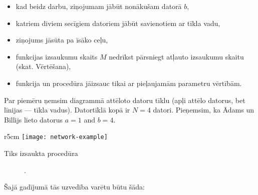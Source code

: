 \documentclass{boi2014-lv}
\begin{document}
    \begin{itemize}
        \item kad  beidz darbu, ziņojumam jābūt nonākušam datorā $b$,
        \item katriem diviem secīgiem datoriem jābūt savienotiem ar tīkla vadu,
        \item ziņojums jāsūta pa īsāko ceļu,
        \item funkcijas  izsaukumu skaits $M$ nedrīkst pārsniegt atļauto izsaukumu skaitu (skat. Vērtēšana),
        \item funkcija  un procedūra  jāizsauc tikai ar pieļaujamām parametru vērtībām.
    \end{itemize}

    \Example
    Par piemēru ņemsim diagrammā attēloto datoru tīklu (apļi attēlo datorus, bet līnijas --- tīkla vadus). Datortīklā 
		kopā ir $N = 4$ datori. Pieņemsim, ka Ādams un Billijs lieto datorus $a = 1$ and $b = 4$.
		

    \begin{wrapfigure}[1]{r}{5cm}
        \texttt{[image: network-example]}
    \end{wrapfigure}

		Tiks izsaukta procedūra
    \begin{figure}[H]
        \centering
        .
    \end{figure}

		Šajā gadījumā tās uzvedība varētu būtu šāda:
\end{document}

